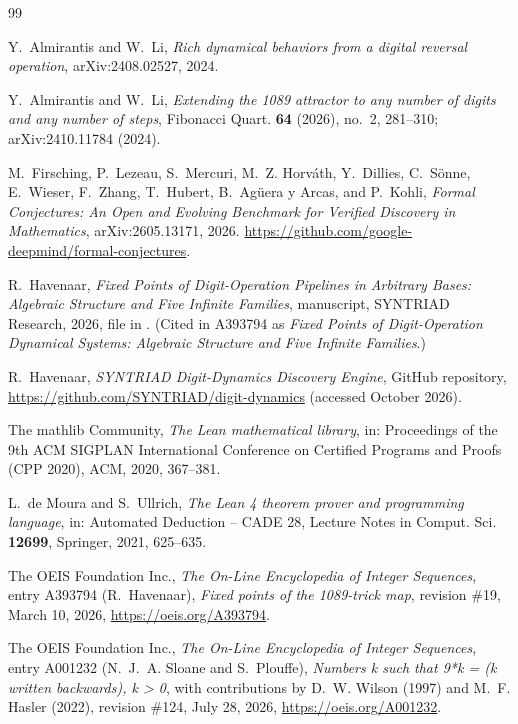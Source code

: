 \documentclass[11pt]{amsart}
\theoremstyle{plain}
\theoremstyle{definition}
\begin{document}
\begin{thebibliography}{99}

Y.~Almirantis and W.~Li, \emph{Rich dynamical behaviors from a digital reversal operation}, arXiv:2408.02527, 2024.

Y.~Almirantis and W.~Li, \emph{Extending the 1089 attractor to any number of digits and any number of steps}, Fibonacci Quart. \textbf{64} (2026), no.~2, 281--310; arXiv:2410.11784 (2024).

M.~Firsching, P.~Lezeau, S.~Mercuri, M.~Z. Horv\'ath, Y.~Dillies, C.~S\"onne, E.~Wieser, F.~Zhang, T.~Hubert, B.~Ag\"uera y Arcas, and P.~Kohli, \emph{Formal Conjectures: An Open and Evolving Benchmark for Verified Discovery in Mathematics}, arXiv:2605.13171, 2026. \url{https://github.com/google-deepmind/formal-conjectures}.

R.~Havenaar, \emph{Fixed Points of Digit-Operation Pipelines in Arbitrary Bases: Algebraic Structure and Five Infinite Families}, manuscript, SYNTRIAD Research, 2026, file  in \cite{HavenaarRepo}. (Cited in A393794 as \emph{Fixed Points of Digit-Operation Dynamical Systems: Algebraic Structure and Five Infinite Families}.)

R.~Havenaar, \emph{SYNTRIAD Digit-Dynamics Discovery Engine}, GitHub repository, \url{https://github.com/SYNTRIAD/digit-dynamics} (accessed October 2026).

The mathlib Community, \emph{The Lean mathematical library}, in: Proceedings of the 9th ACM SIGPLAN International Conference on Certified Programs and Proofs (CPP 2020), ACM, 2020, 367--381.

L.~de Moura and S.~Ullrich, \emph{The Lean 4 theorem prover and programming language}, in: Automated Deduction -- CADE 28, Lecture Notes in Comput. Sci. \textbf{12699}, Springer, 2021, 625--635.

The OEIS Foundation Inc., \emph{The On-Line Encyclopedia of Integer Sequences}, entry A393794 (R.~Havenaar), \emph{Fixed points of the 1089-trick map}, revision \#19, March 10, 2026, \url{https://oeis.org/A393794}.

The OEIS Foundation Inc., \emph{The On-Line Encyclopedia of Integer Sequences}, entry A001232 (N.~J.~A. Sloane and S.~Plouffe), \emph{Numbers k such that 9*k = (k written backwards), k > 0}, with contributions by D.~W. Wilson (1997) and M.~F. Hasler (2022), revision \#124, July 28, 2026, \url{https://oeis.org/A001232}.


\end{thebibliography}
\end{document}
